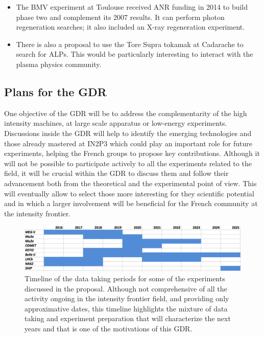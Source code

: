 \begin{itemize}
\item The BMV experiment at Toulouse received ANR funding in 2014 to build phase two and complement its 2007 results. It can perform photon regeneration searches; it also included an X-ray regeneration experiment.
\item There is also a proposal to use the Tore Supra tokamak at Cadarache to search for ALPs. This would be particularly interesting to interact with the plasma physics community. 
\end{itemize}


\subsection*{Plans for the GDR}
One objective of the GDR will be to address the complementarity of the high intensity machines,  at large scale apparatus or low-energy experiments.  Discussions inside the GDR will help to identify the emerging technologies and those already mastered at IN2P3 which could play an important role for future experiments, helping the French groups to propose key contributions.  
Although it will not be possible to participate actively to all the experiments related to the field, it will be crucial within the GDR to discuss them and follow their advancement both from the theoretical and the experimental point of view. This will   eventually allow to select those more interesting for they scientific potential and in which a larger involvement will be beneficial for the French community at the intensity frontier. 



\begin{figure}[!htb]
\begin{center}
\includegraphics[width=12cm]{timeline.pdf}
\end{center}
\caption{Timeline of the data taking periods for some of the experiments discussed in the proposal. Although not comprehensive of all the activity ongoing in the intensity frontier field, and providing only  approximative dates, this timeline highlights the mixture of data taking and experiment preparation that will characterize the next years and that is one of the motivations of this GDR. }%
\label{timeline}%
\end{figure}


